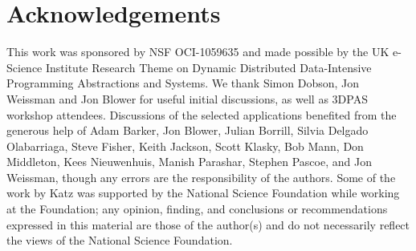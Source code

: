 






\section*{Acknowledgements}
This work was sponsored by NSF OCI-1059635 and made possible by the UK e-Science
Institute Research Theme on Dynamic Distributed Data-Intensive Programming
Abstractions and Systems. We thank Simon Dobson, Jon Weissman and Jon Blower for
useful initial discussions, as well as 3DPAS workshop attendees. Discussions of
the selected applications benefited from the generous help of Adam Barker, Jon
Blower, Julian Borrill, Silvia Delgado Olabarriaga, Steve Fisher, Keith Jackson,
Scott Klasky, Bob Mann, Don Middleton, Kees Nieuwenhuis, Manish Parashar,
Stephen Pascoe, and Jon Weissman, though any errors are the responsibility of
the authors.  Some of the work by Katz was supported by the National Science
Foundation while working at the Foundation; any opinion, finding, and
conclusions or recommendations expressed in this material are those of the
author(s) and do not necessarily reflect the views of the National Science
Foundation.

